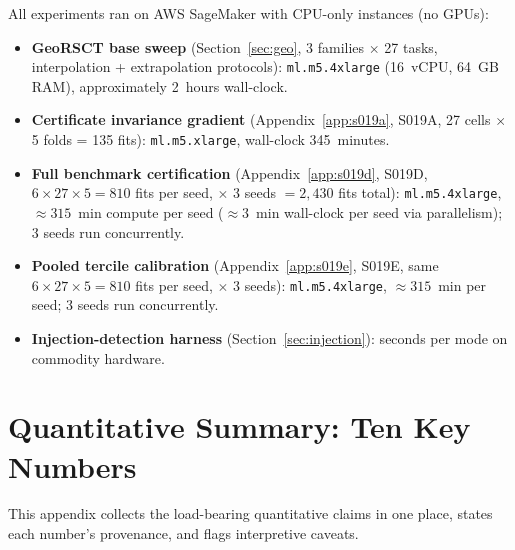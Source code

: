 \documentclass{article}
\begin{document}
All experiments ran on AWS SageMaker with CPU-only instances (no GPUs):
\begin{itemize}
\item \textbf{GeoRSCT base sweep} (Section~\ref{sec:geo}, 3 families $\times$ 27 tasks, interpolation + extrapolation protocols): \texttt{ml.m5.4xlarge} (16~vCPU, 64~GB RAM), approximately 2~hours wall-clock.
\item \textbf{Certificate invariance gradient} (Appendix~\ref{app:s019a}, S019A, 27 cells $\times$ 5 folds = 135 fits): \texttt{ml.m5.xlarge}, wall-clock 345~minutes.
\item \textbf{Full benchmark certification} (Appendix~\ref{app:s019d}, S019D, $6 \times 27 \times 5 = 810$ fits per seed, $\times$ 3 seeds $= 2{,}430$ fits total): \texttt{ml.m5.4xlarge}, ${\approx}315$~min compute per seed (${\approx}3$~min wall-clock per seed via parallelism); 3 seeds run concurrently.
\item \textbf{Pooled tercile calibration} (Appendix~\ref{app:s019e}, S019E, same $6 \times 27 \times 5 = 810$ fits per seed, $\times$ 3 seeds): \texttt{ml.m5.4xlarge}, ${\approx}315$~min per seed; 3 seeds run concurrently.
\item \textbf{Injection-detection harness} (Section~\ref{sec:injection}): seconds per mode on commodity hardware.
\end{itemize}

\section{Quantitative Summary: Ten Key Numbers}
\label{app:key_numbers}

This appendix collects the load-bearing quantitative claims in one place, states each number's provenance, and flags interpretive caveats.
\end{document}
